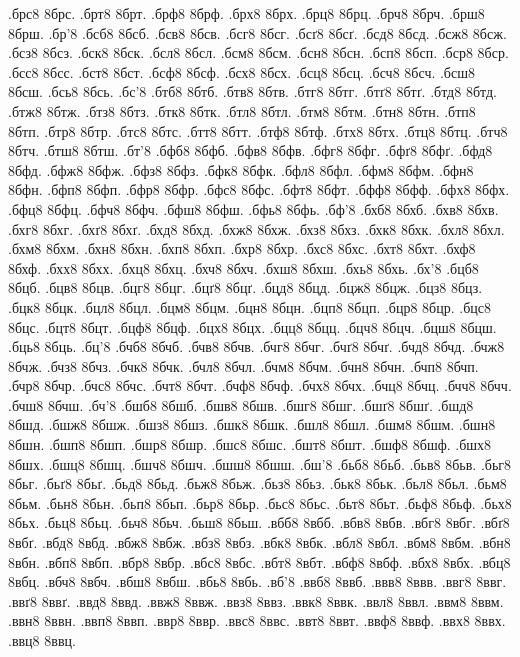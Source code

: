 {.брс8 8брс.
.брт8 8брт.
.брф8 8брф.
.брх8 8брх.
.брц8 8брц.
.брч8 8брч.
.брш8 8брш.
.бр'8
.бсб8 8бсб.
.бсв8 8бсв.
.бсг8 8бсг.
.бсґ8 8бсґ.
.бсд8 8бсд.
.бсж8 8бсж.
.бсз8 8бсз.
.бск8 8бск.
.бсл8 8бсл.
.бсм8 8бсм.
.бсн8 8бсн.
.бсп8 8бсп.
.бср8 8бср.
.бсс8 8бсс.
.бст8 8бст.
.бсф8 8бсф.
.бсх8 8бсх.
.бсц8 8бсц.
.бсч8 8бсч.
.бсш8 8бсш.
.бсь8 8бсь.
.бс'8
.бтб8 8бтб.
.бтв8 8бтв.
.бтг8 8бтг.
.бтґ8 8бтґ.
.бтд8 8бтд.
.бтж8 8бтж.
.бтз8 8бтз.
.бтк8 8бтк.
.бтл8 8бтл.
.бтм8 8бтм.
.бтн8 8бтн.
.бтп8 8бтп.
.бтр8 8бтр.
.бтс8 8бтс.
.бтт8 8бтт.
.бтф8 8бтф.
.бтх8 8бтх.
.бтц8 8бтц.
.бтч8 8бтч.
.бтш8 8бтш.
.бт'8
.бфб8 8бфб.
.бфв8 8бфв.
.бфг8 8бфг.
.бфґ8 8бфґ.
.бфд8 8бфд.
.бфж8 8бфж.
.бфз8 8бфз.
.бфк8 8бфк.
.бфл8 8бфл.
.бфм8 8бфм.
.бфн8 8бфн.
.бфп8 8бфп.
.бфр8 8бфр.
.бфс8 8бфс.
.бфт8 8бфт.
.бфф8 8бфф.
.бфх8 8бфх.
.бфц8 8бфц.
.бфч8 8бфч.
.бфш8 8бфш.
.бфь8 8бфь.
.бф'8
.бхб8 8бхб.
.бхв8 8бхв.
.бхг8 8бхг.
.бхґ8 8бхґ.
.бхд8 8бхд.
.бхж8 8бхж.
.бхз8 8бхз.
.бхк8 8бхк.
.бхл8 8бхл.
.бхм8 8бхм.
.бхн8 8бхн.
.бхп8 8бхп.
.бхр8 8бхр.
.бхс8 8бхс.
.бхт8 8бхт.
.бхф8 8бхф.
.бхх8 8бхх.
.бхц8 8бхц.
.бхч8 8бхч.
.бхш8 8бхш.
.бхь8 8бхь.
.бх'8
.бцб8 8бцб.
.бцв8 8бцв.
.бцг8 8бцг.
.бцґ8 8бцґ.
.бцд8 8бцд.
.бцж8 8бцж.
.бцз8 8бцз.
.бцк8 8бцк.
.бцл8 8бцл.
.бцм8 8бцм.
.бцн8 8бцн.
.бцп8 8бцп.
.бцр8 8бцр.
.бцс8 8бцс.
.бцт8 8бцт.
.бцф8 8бцф.
.бцх8 8бцх.
.бцц8 8бцц.
.бцч8 8бцч.
.бцш8 8бцш.
.бць8 8бць.
.бц'8
.бчб8 8бчб.
.бчв8 8бчв.
.бчг8 8бчг.
.бчґ8 8бчґ.
.бчд8 8бчд.
.бчж8 8бчж.
.бчз8 8бчз.
.бчк8 8бчк.
.бчл8 8бчл.
.бчм8 8бчм.
.бчн8 8бчн.
.бчп8 8бчп.
.бчр8 8бчр.
.бчс8 8бчс.
.бчт8 8бчт.
.бчф8 8бчф.
.бчх8 8бчх.
.бчц8 8бчц.
.бчч8 8бчч.
.бчш8 8бчш.
.бч'8
.бшб8 8бшб.
.бшв8 8бшв.
.бшг8 8бшг.
.бшґ8 8бшґ.
.бшд8 8бшд.
.бшж8 8бшж.
.бшз8 8бшз.
.бшк8 8бшк.
.бшл8 8бшл.
.бшм8 8бшм.
.бшн8 8бшн.
.бшп8 8бшп.
.бшр8 8бшр.
.бшс8 8бшс.
.бшт8 8бшт.
.бшф8 8бшф.
.бшх8 8бшх.
.бшц8 8бшц.
.бшч8 8бшч.
.бшш8 8бшш.
.бш'8
.бьб8 8бьб.
.бьв8 8бьв.
.бьг8 8бьг.
.бьґ8 8бьґ.
.бьд8 8бьд.
.бьж8 8бьж.
.бьз8 8бьз.
.бьк8 8бьк.
.бьл8 8бьл.
.бьм8 8бьм.
.бьн8 8бьн.
.бьп8 8бьп.
.бьр8 8бьр.
.бьс8 8бьс.
.бьт8 8бьт.
.бьф8 8бьф.
.бьх8 8бьх.
.бьц8 8бьц.
.бьч8 8бьч.
.бьш8 8бьш.
.вбб8 8вбб.
.вбв8 8вбв.
.вбг8 8вбг.
.вбґ8 8вбґ.
.вбд8 8вбд.
.вбж8 8вбж.
.вбз8 8вбз.
.вбк8 8вбк.
.вбл8 8вбл.
.вбм8 8вбм.
.вбн8 8вбн.
.вбп8 8вбп.
.вбр8 8вбр.
.вбс8 8вбс.
.вбт8 8вбт.
.вбф8 8вбф.
.вбх8 8вбх.
.вбц8 8вбц.
.вбч8 8вбч.
.вбш8 8вбш.
.вбь8 8вбь.
.вб'8
.ввб8 8ввб.
.ввв8 8ввв.
.ввг8 8ввг.
.ввґ8 8ввґ.
.ввд8 8ввд.
.ввж8 8ввж.
.ввз8 8ввз.
.ввк8 8ввк.
.ввл8 8ввл.
.ввм8 8ввм.
.ввн8 8ввн.
.ввп8 8ввп.
.ввр8 8ввр.
.ввс8 8ввс.
.ввт8 8ввт.
.ввф8 8ввф.
.ввх8 8ввх.
.ввц8 8ввц.
}
